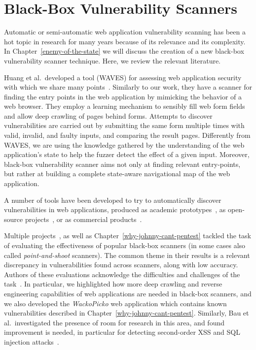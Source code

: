 \section{Black-Box Vulnerability Scanners}

Automatic or semi-automatic web application vulnerability scanning has
been a hot topic in research for many years because of its relevance
and its complexity. In Chapter~\ref{enemy-of-the-state} we will
discuss the creation of a new black-box vulnerability scanner
technique. Here, we review the relevant literature.

Huang et al.\ developed a tool (WAVES) for assessing web application
security with which we share many points~\cite{huang03:web}. Similarly
to our work, they have a scanner for finding the entry points in the
web application by mimicking the behavior of a web browser. They
employ a learning mechanism to sensibly fill web form fields and allow
deep crawling of pages behind forms. Attempts to discover
vulnerabilities are carried out by submitting the same form multiple
times with valid, invalid, and faulty inputs, and comparing the result
pages. Differently from WAVES, we are using the knowledge gathered by
the understanding of the web application's state to help the fuzzer
detect the effect of a given input. Moreover, black-box vulnerability
scanner aims not only at finding relevant entry-points, but rather at
building a complete state-aware navigational map of the web
application.

A number of tools have been developed to try to automatically discover
vulnerabilities in web applications, produced as academic
prototypes~\cite{kals06:secubat, halfond09:penetration,
  jovanovic10:static, huang04:securing, balzarotti08:saner,
  felmetsger10:logic, li12:sentinel}, as open-source
projects~\cite{w3af, grendelscan, paros}, or as commercial
products~\cite{acunetix, appscan, burp, webinspect}.

Multiple projects~\cite{bau10:state, suto10:webscanners, vieira09}, as
well as Chapter~\ref{why-johnny-cant-pentest} tackled the task of
evaluating the effectiveness of popular black-box scanners (in some
cases also called \emph{point-and-shoot} scanners). The common theme
in their results is a relevant discrepancy in vulnerabilities found
across scanners, along with low accuracy. Authors of these evaluations
acknowledge the difficulties and challenges of the
task~\cite{grossman04, vieira09}. In particular, we highlighted how
more deep crawling and reverse engineering capabilities of web
applications are needed in black-box scanners, and we also developed
the \emph{WackoPicko} web application which contains known
vulnerabilities described in Chapter~\ref{why-johnny-cant-pentest}.
Similarly, Bau et al.\ investigated the presence of room for research
in this area, and found improvement is needed, in particular for
detecting second-order XSS and SQL injection
attacks~\cite{bau10:state}.

